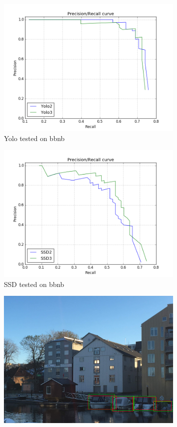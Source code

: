 \begin{figure}[h!]
\begin{subfigure}{.5\textwidth}
  \centering
  \includegraphics[width=0.8\linewidth]{results/case_buildings/prec_recall/yolo/bb.png}
  \caption{Yolo tested on bbnb}
  \label{fig:ex_bnbb_prec_rec_yolo}
\end{subfigure}%
\begin{subfigure}{.5\textwidth}
  \centering
  \includegraphics[width=.8\linewidth]{results/case_buildings/prec_recall/ssd/bb.png}
  \caption{SSD tested on bbnb}
  \label{fig:ex_bnbb_prec_rec_ssd}
\end{subfigure}
\begin{subfigure}{.5\textwidth}
  \centering
  \includegraphics[width=0.8\linewidth]{results/case_buildings/prec_recall/yolo/IMG_2077_bbnb.jpg}

\end{subfigure}
\end{figure}
